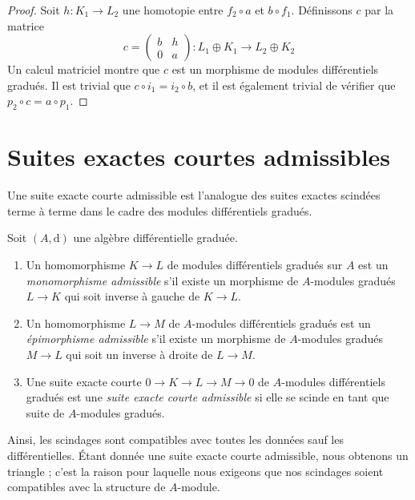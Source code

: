 \begin{proof}
Soit $h : K_1 \to L_2$ une homotopie entre $f_2 \circ a$ et $b \circ f_1$. Définissons
$c$ par la matrice
$$
c =
\left(
\begin{matrix}
b & h \\
0 & a
\end{matrix}
\right) :
L_1 \oplus K_1 \to L_2 \oplus K_2
$$
Un calcul matriciel montre que $c$ est un morphisme de modules
différentiels gradués. Il est trivial que $c \circ i_1 = i_2 \circ b$, et il est
également trivial de vérifier que $p_2 \circ c = a \circ p_1$.
\end{proof}











\section{Suites exactes courtes admissibles}
\label{section-admissible}

\noindent
Une suite exacte courte admissible est l'analogue des suites exactes scindées
terme à terme dans le cadre des modules différentiels gradués.

\begin{definition}
\label{definition-admissible-ses}
Soit $(A, \text{d})$ une algèbre différentielle graduée.
\begin{enumerate}
\item Un homomorphisme $K \to L$ de modules différentiels gradués sur $A$ est un {\it
monomorphisme admissible} s'il existe un morphisme de $A$-modules gradués $L \to K$
qui soit inverse à gauche de $K \to L$.
\item Un homomorphisme $L \to M$ de $A$-modules différentiels gradués est un {\it
épimorphisme admissible} s'il existe un morphisme de $A$-modules gradués $M \to L$
qui soit un inverse à droite de $L \to M$.
\item Une suite exacte courte $0 \to K \to L \to M \to 0$ de $A$-modules
différentiels gradués est une {\it suite exacte courte admissible} si elle se
scinde en tant que suite de $A$-modules gradués.
\end{enumerate}
\end{definition}

\noindent
Ainsi, les scindages sont compatibles avec toutes les données sauf les
différentielles. Étant donnée une suite exacte courte admissible, nous obtenons un
triangle ; c'est la raison pour laquelle nous exigeons que nos scindages soient
compatibles avec la structure de $A$-module.

